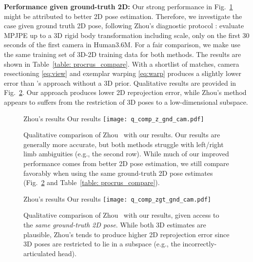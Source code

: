 \documentclass[10pt,twocolumn,letterpaper]{article}
\begin{document}
{\bf Performance given ground-truth 2D:}
Our strong performance in Fig.~\ref{fig:vis_comp} might be attributed to better 2D pose estimation. Therefore, we investigate the case given ground truth 2D pose, following Zhou's diagnostic protocol \cite{Zhou_2016_CVPR}: evaluate MPJPE up to a 3D rigid body transformation including scale, only on the first 30 seconds of the first camera in Human3.6M. For a fair comparison, we make use the same training set of 3D-2D training data for both methods. The results are shown in Table~\ref{table: procrus_compare}. With a shortlist of  matches, camera resectioning \eqref{eq:view} and exemplar warping \eqref{eq:warp} produces a slightly lower error than \cite{Zhou_2016_CVPR}'s approach without a 3D prior.
Qualitative results are provided in Fig.~\ref{fig:vis_comp_gt2d}. Our approach produces lower 2D reprojection error, while Zhou's method appears to suffers from the restriction of 3D poses to a low-dimensional subspace.


\begin{figure}[t!]
\centering
Zhou's results \hspace{45pt} Our results
\texttt{[image: q\_comp\_z\_gnd\_cam.pdf]}
   \caption{Qualitative comparison of Zhou~\cite{Zhou_2016_CVPR} with our results. Our results are generally more accurate, but both methods struggle with left/right limb ambiguities (e.g., the second row). While much of our improved performance comes from better 2D pose estimation, we still compare favorably when using the same ground-truth 2D pose estimates (Fig.~\ref{fig:vis_comp_gt2d} and Table~\ref{table: procrus_compare}).}
\label{fig:vis_comp}
\end{figure}

\begin{figure}[t!]
\centering
Zhou's results \hspace{45pt} Our results
\texttt{[image: q\_comp\_zgt\_gnd\_cam.pdf]}
   \caption{Qualitative comparison of Zhou~\cite{Zhou_2016_CVPR} with our results, given access to the {\em same ground-truth 2D pose}. While both 3D estimates are plausible, Zhou's tends to produce higher 2D reprojection error since 3D poses are restricted to lie in a subspace (e.g., the incorrectly-articulated head).}
\label{fig:vis_comp_gt2d}
\end{figure}
\end{document}
